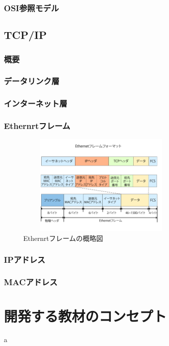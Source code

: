 \documentclass[12pt,a4j,titlepage]{ltjsarticle}
\begin{document}
\subsubsection{OSI参照モデル}
\subsection{TCP/IP}
\subsubsection{概要}
\subsubsection{データリンク層}
\subsubsection{インターネット層}

\subsubsection{Ethernrtフレーム}
\begin{figure}[h]
\centering
\includegraphics[clip,width=85mm,height=50mm]{figures/ethernet.pdf}
\caption[Ethernrtフレームの概略図]{Ethernrtフレームの概略図\linebreak}
\label{fig:ether}
\end{figure}

\subsubsection{IPアドレス}
\subsubsection{MACアドレス}

\clearpage
\section{開発する教材のコンセプト}
a
\end{document}

